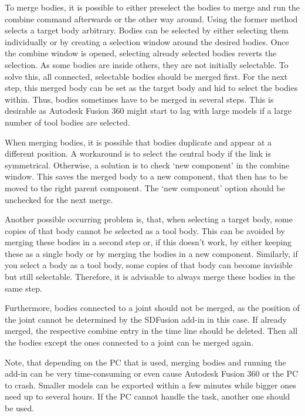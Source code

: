 To merge bodies, it is possible to either preselect the bodies to merge and run the combine command afterwards or the other way around. Using the former method selects a target body arbitrary. Bodies can be selected by either selecting them individually or by creating a selection window around the desired bodies. Once the combine window is opened, selecting already selected bodies reverts the selection. As some bodies are inside others, they are not initially selectable. To solve this, all connected, selectable bodies should be merged first. For the next step, this merged body can be set as the target body and hid to select the bodies within. Thus, bodies sometimes have to be merged in several steps. This is desirable as Autodesk Fusion 360 might start to lag with large models if a large number of tool bodies are selected.

When merging bodies, it is possible that bodies duplicate and appear at a different position. A workaround is to select the central body if the link is symmetrical. Otherwise, a solution is to check ‘new component’ in the combine window. This saves the merged body to a new component, that then has to be moved to the right parent component. The ‘new component’ option should be unchecked for the next merge.

Another possible occurring problem is, that, when selecting a target body, some copies of that body cannot be selected as a tool body. This can be avoided by merging these bodies in a second step or, if this doesn’t work, by either keeping these as a single body or by merging the bodies in a new component. Similarly, if you select a body as a tool body, some copies of that body can become invisible but still selectable. Therefore, it is advisable to always merge these bodies in the same step.

Furthermore, bodies connected to a joint should not be merged, as the position of the joint cannot be determined by the SDFusion add-in in this case. If already merged, the respective combine entry in the time line should be deleted. Then all the bodies except the ones connected to a joint can be merged again.

Note, that depending on the PC that is used, merging bodies and running the add-in can be very time-consuming or even cause Autodesk Fusion 360  or the PC to crash. Smaller models can be exported within a few minutes while bigger ones need up to several hours. If the PC cannot handle the task, another one should be used.
%

